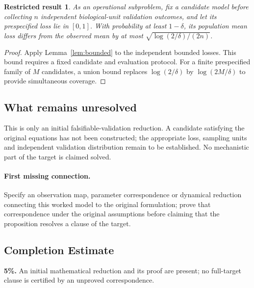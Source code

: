 \documentclass[11pt]{article}
\newtheorem{attemptresult}{Restricted result}[section]
\begin{document}
\begin{attemptresult}
As an operational subproblem, fix a candidate model before collecting $n$ independent biological-unit validation outcomes, and let its prespecified loss lie in $[0,1]$. With probability at least $1-\delta$, its population mean loss differs from the observed mean by at most $\sqrt{\log(2/\delta)/(2n)}$.
\end{attemptresult}
\begin{proof}
Apply Lemma~\ref{lem:bounded} to the independent bounded losses. This bound requires a fixed candidate and evaluation protocol. For a finite prespecified family of $M$ candidates, a union bound replaces $\log(2/\delta)$ by $\log(2M/\delta)$ to provide simultaneous coverage.
\end{proof}
\subsection{What remains unresolved}
This is only an initial falsifiable-validation reduction. A candidate satisfying the original equations has not been constructed; the appropriate loss, sampling units and independent validation distribution remain to be established. No mechanistic part of the target is claimed solved.
\paragraph{First missing connection.} Specify an observation map, parameter correspondence or dynamical reduction connecting this worked model to the original formulation; prove that correspondence under the original assumptions before claiming that the proposition resolves a clause of the target.
\subsection{Completion Estimate}
\textbf{5\%.} An initial mathematical reduction and its proof are present; no full-target clause is certified by an unproved correspondence.
\end{document}
